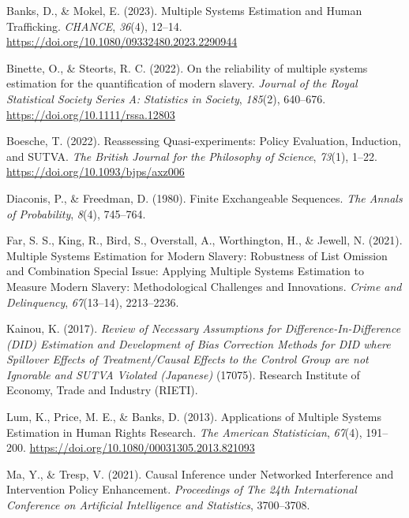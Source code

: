 \documentclass[
  12pt,
]{article}
\newlength{\cslhangindent}
\newenvironment{CSLReferences}[2] %
 {\begin{list}{}{%
  \setlength{\itemindent}{0pt}
  \setlength{\leftmargin}{0pt}
  \setlength{\parsep}{0pt}
  \ifodd #1
   \setlength{\leftmargin}{\cslhangindent}
   \setlength{\itemindent}{-1\cslhangindent}
  \fi
  \setlength{\itemsep}{#2\baselineskip}}}
 {\end{list}}
\theoremstyle{plain}
\theoremstyle{definition}
\begin{document}
\label{refs}
\begin{CSLReferences}{1}{0}
Banks, D., \& Mokel, E. (2023). Multiple {Systems Estimation} and {Human
Trafficking}. \emph{CHANCE}, \emph{36}(4), 12--14.
\url{https://doi.org/10.1080/09332480.2023.2290944}

Binette, O., \& Steorts, R. C. (2022). On the reliability of multiple
systems estimation for the quantification of modern slavery.
\emph{Journal of the Royal Statistical Society Series A: Statistics in
Society}, \emph{185}(2), 640--676.
\url{https://doi.org/10.1111/rssa.12803}

Boesche, T. (2022). Reassessing {Quasi-experiments}: {Policy
Evaluation}, {Induction}, and {SUTVA}. \emph{The British Journal for the
Philosophy of Science}, \emph{73}(1), 1--22.
\url{https://doi.org/10.1093/bjps/axz006}

Diaconis, P., \& Freedman, D. (1980). Finite {Exchangeable Sequences}.
\emph{The Annals of Probability}, \emph{8}(4), 745--764.

Far, S. S., King, R., Bird, S., Overstall, A., Worthington, H., \&
Jewell, N. (2021). Multiple {Systems Estimation} for {Modern Slavery}:
{Robustness} of {List Omission} and {Combination Special Issue}:
{Applying Multiple Systems Estimation} to {Measure Modern Slavery}:
{Methodological Challenges} and {Innovations}. \emph{Crime and
Delinquency}, \emph{67}(13--14), 2213--2236.

Kainou, K. (2017). \emph{Review of {Necessary Assumptions} for
{Difference-In-Difference} ({DID}) {Estimation} and {Development} of
{Bias Correction Methods} for {DID} where {Spillover Effects} of
{Treatment}/{Causal Effects} to the {Control Group} are not {Ignorable}
and {SUTVA Violated} ({Japanese})} (17075). {Research Institute of
Economy, Trade and Industry (RIETI).}

Lum, K., Price, M. E., \& Banks, D. (2013). Applications of {Multiple
Systems Estimation} in {Human Rights Research}. \emph{The American
Statistician}, \emph{67}(4), 191--200.
\url{https://doi.org/10.1080/00031305.2013.821093}

Ma, Y., \& Tresp, V. (2021). Causal {Inference} under {Networked
Interference} and {Intervention Policy Enhancement}. \emph{Proceedings
of {The} 24th {International Conference} on {Artificial Intelligence}
and {Statistics}}, 3700--3708.


\end{CSLReferences}
\end{document}
